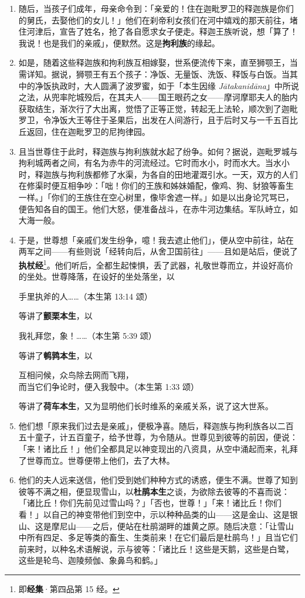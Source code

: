 \begin{enumerate}
\item 随后，当孩子们成年，母亲命令到：「亲爱的！住在迦毗罗卫的释迦族是你们的舅氏，去娶他们的女儿！」他们在刹帝利女孩们在河中嬉戏的那天前往，堵住河津后，宣告了姓名，抢了各自愿求女子便走。释迦王族听说，想「算了！我说！也是我们的亲戚」，便默然。这是\textbf{拘利族}的缘起。
\item 如是，随着这些释迦族和拘利族互相嫁娶，世系便流传下来，直至狮颚王，当需详知。据说，狮颚王有五个孩子：净饭、无量饭、洗饭、释饭与白饭。当其中的净饭执政时，大人圆满了波罗蜜，如于「本生因缘 \textit{Jātakanidāna}」中所说之法，从兜率陀城殁后，在其夫人——国王眼药之女——摩诃摩耶夫人的胎内获取结生，渐次行了大出离，觉悟了正等正觉，转起无上法轮，顺次到了迦毗罗卫，令净饭大王等住于圣果后，出发在人间游行，且于后时又与一千五百比丘返回，住在迦毗罗卫的尼拘律园。
\item 且当世尊住于此时，释迦族与拘利族就水起了纷争。如何？据说，迦毗罗城与拘利城两者之间，有名为赤牛的河流经过。它时而水小，时而水大。当水小时，释迦族与拘利族都修了水渠，为各自的田地灌溉引水。一天，双方的人们在修渠时便互相争吵：「咄！你们的王族和姊妹婚配，像鸡、狗、豺狼等畜生一样。」「你们的王族住在空心树里，像毕舍遮一样。」如是以出身论咒骂已，便告知各自的国王。他们大怒，便准备战斗，在赤牛河边集结。军队峙立，如大海一般。
\item 于是，世尊想「亲戚们发生纷争，噫！我去遮止他们」，便从空中前往，站在两军之间——有些则说「经转向后，从舍卫国前往」——且如是站后，便说了\textbf{执杖经}\footnote{即\textbf{经集}·第四品第 15 经。}。他们听后，全都生起悚惧，丢了武器，礼敬世尊而立，并设好高价的坐处。世尊降落，在设好的坐处落坐，以\begin{quoting}手里执斧的人……（本生第 13:14 颂）\end{quoting}等讲了\textbf{颤栗本生}，以\begin{quoting}我礼拜您，象！……（本生第 5:39 颂）\end{quoting}等讲了\textbf{鹌鹑本生}，以\begin{quoting}互相问候，众鸟除去网而飞翔，\\而当它们争论时，便入我彀中。（本生第 1:33 颂）\end{quoting}等讲了\textbf{荷车本生}，又为显明他们长时维系的亲戚关系，说了这大世系。
\item 他们想「原来我们过去是亲戚」，便极净喜。随后，释迦族与拘利族各以二百五十童子，计五百童子，给予世尊，为令随从。世尊见到彼等的前因，便说：「来！诸比丘！」他们全都具足以神变现出的八资具，从空中涌起而来，礼拜了世尊而立。世尊便带上他们，去了大林。
\item 他们的夫人远来送信，他们受到她们种种方式的诱惑，便生不满。世尊了知到彼等不满之相，便显现雪山，以\textbf{杜鹃本生}之谈，为欲除去彼等的不喜而说：「诸比丘！你们先前见过雪山吗？」「否也，世尊！」「来！诸比丘！你们看！」以自己的神变带他们到空中，示以种种品类的山——这是金山、这是银山、这是摩尼山——之后，便站在杜鹃湖畔的雄黄之原。随后决意：「让雪山中所有四足、多足等类的畜生、生类前来！在它们最后是杜鹃鸟！」且当它们前来时，以种名术语解说，示与彼等：「诸比丘！这些是天鹅，这些是白鹭，这些是轮鸟、迦陵频伽、象鼻鸟和鹤。」

\end{enumerate}
